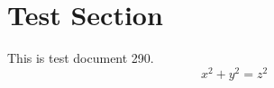 \documentclass{article}
\begin{document}
\section{Test Section}
This is test document 290.
\begin{equation}
x^2 + y^2 = z^2
\end{equation}
\end{document}
